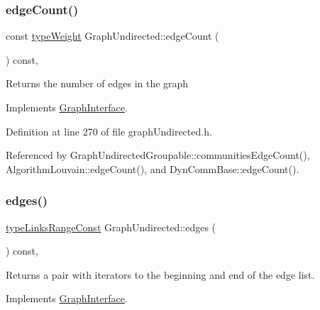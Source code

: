\subsubsection{\texorpdfstring{edge\+Count()}{edgeCount()}}
{\footnotesize\ttfamily const \hyperlink{edge_8h_a2e7ea3be891ac8b52f749ec73fee6dd2}{type\+Weight} Graph\+Undirected\+::edge\+Count (\begin{DoxyParamCaption}{ }\end{DoxyParamCaption}) const\hspace{0.3cm}{\ttfamily [inline]}, {\ttfamily [virtual]}}

\begin{DoxyReturn}{Returns}
the number of edges in the graph 
\end{DoxyReturn}


Implements \hyperlink{classGraphInterface_a057eb801c6d7f594cdedc205a0d081a9}{Graph\+Interface}.



Definition at line 270 of file graph\+Undirected.\+h.



Referenced by Graph\+Undirected\+Groupable\+::communities\+Edge\+Count(), Algorithm\+Louvain\+::edge\+Count(), and Dyn\+Comm\+Base\+::edge\+Count().

\mbox{\label{classGraphUndirected_aa6fa3435fb456f1a7e9642b631878431}} 
\subsubsection{\texorpdfstring{edges()}{edges()}}
{\footnotesize\ttfamily \hyperlink{graphInterface_8h_ae8d27008f15586bbf419af7ad2e0a48a}{type\+Links\+Range\+Const} Graph\+Undirected\+::edges (\begin{DoxyParamCaption}{ }\end{DoxyParamCaption}) const\hspace{0.3cm}{\ttfamily [inline]}, {\ttfamily [virtual]}}

\begin{DoxyReturn}{Returns}
a pair with iterators to the beginning and end of the edge list. 
\end{DoxyReturn}


Implements \hyperlink{classGraphInterface_a2ac54d73e88516d6793a9a6fc0e434ee}{Graph\+Interface}.



